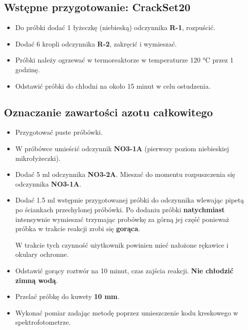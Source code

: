 \documentclass[
  letterpaper,
  DIV=11,
  numbers=noendperiod]{scrreprt}
\begin{document}
\hypertarget{wstux119pne-przygotowanie-crackset20}{%
\subsection{Wstępne przygotowanie:
CrackSet20}\label{wstux119pne-przygotowanie-crackset20}}

\begin{itemize}
\item
  Do próbki dodać 1 łyżeczkę (niebieską) odczynnika \textbf{R-1},
  rozpuścić.
\item
  Dodać 6 kropli odczynnika \textbf{R-2}, zakręcić i wymieszać.
\item
  Próbki należy ogrzewać w termoreaktorze w temperaturze 120 °C przez 1
  godzinę.
\item
  Odstawić próbki do chłodni na około 15 minut w celu ostudzenia.
\end{itemize}

\hypertarget{oznaczanie-zawartoux15bci-azotu-caux142kowitego}{%
\subsection{Oznaczanie zawartości azotu
całkowitego}\label{oznaczanie-zawartoux15bci-azotu-caux142kowitego}}

\begin{itemize}
\item
  Przygotować puste próbówki.
\item
  W próbówce umieścić odczynnik \textbf{NO3-1A} (pierwszy poziom
  niebieskiej mikrołyżeczki).
\item
  Dodać 5 ml odczynnika \textbf{NO3-2A}. Mieszać do momentu
  rozpuszczenia się odczynnika \textbf{NO3-1A}.
\item
  Dodać 1.5 ml wstępnie przygotowanej próbki do odczynnika wlewając
  pipetą po ściankach przechylonej próbówki. Po dodaniu próbki
  \textbf{natychmiast} intensywnie wymieszać trzymając probówkę za górną
  jej część ponieważ próbka w trakcie reakcji zrobi się \textbf{gorąca}.

  W trakcie tych czynność użytkownik powinien mieć nałożone rękawice i
  okulary ochronne.
\item
  Odstawić gorący roztwór na 10 minut, czas zajścia reakcji. \textbf{Nie
  chłodzić zimną wodą}.
\item
  Przelać próbkę do kuwety \textbf{10 mm}.
\item
  Wykonać pomiar zadając metodę poprzez umieszczenie kodu kreskowego w
  spektrofotometrze.
\end{itemize}
\end{document}

